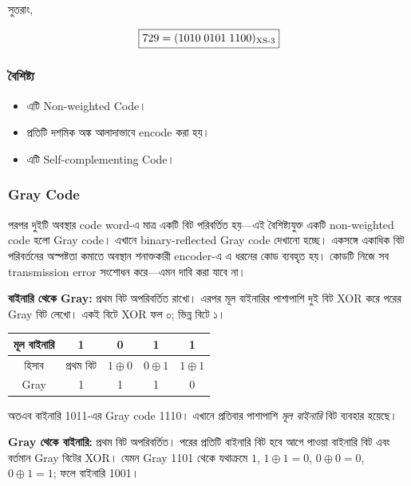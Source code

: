 সুতরাং,

\[
\boxed{
729
=
(1010\;0101\;1100)_{\text{\textenglish{XS-3}}}
}
\]

\subsubsection*{বৈশিষ্ট্য}

\begin{itemize}[label={{\bulletfont\textbullet}}, leftmargin=*, nosep]
    \item এটি \textenglish{Non-weighted Code}।
    \item প্রতিটি দশমিক অঙ্ক আলাদাভাবে
    \textenglish{encode} করা হয়।
    \item এটি \textenglish{Self-complementing Code}।
\end{itemize}


\subsubsection*{Gray Code}
পরপর দুইটি অবস্থার code word-এ মাত্র একটি বিট পরিবর্তিত হয়—এই বৈশিষ্ট্যযুক্ত একটি non-weighted code হলো Gray code। এখানে binary-reflected Gray code দেখানো হচ্ছে। একসঙ্গে একাধিক বিট পরিবর্তনের অস্পষ্টতা কমাতে অবস্থান শনাক্তকারী encoder-এ এ ধরনের কোড ব্যবহৃত হয়। কোডটি নিজে সব transmission error সংশোধন করে—এমন দাবি করা যাবে না।

\textbf{বাইনারি থেকে Gray:} প্রথম বিট অপরিবর্তিত রাখো। এরপর মূল বাইনারির পাশাপাশি দুই বিট XOR করে পরের Gray বিট লেখো। একই বিটে XOR ফল ০; ভিন্ন বিটে ১।
\begin{center}\begin{tabular}{|c|c|c|c|c|}\hline
মূল বাইনারি&1&0&1&1\\\hline
হিসাব&প্রথম বিট&$1\oplus0$&$0\oplus1$&$1\oplus1$\\\hline
Gray&1&1&1&0\\\hline
\end{tabular}\end{center}
অতএব বাইনারি 1011-এর Gray code 1110। এখানে প্রতিবার পাশাপাশি \emph{মূল বাইনারি} বিট ব্যবহার হয়েছে।

\textbf{Gray থেকে বাইনারি:} প্রথম বিট অপরিবর্তিত। পরের প্রতিটি বাইনারি বিট হবে আগে পাওয়া বাইনারি বিট এবং বর্তমান Gray বিটের XOR। যেমন Gray 1101 থেকে যথাক্রমে $1$, $1\oplus1=0$, $0\oplus0=0$, $0\oplus1=1$; ফলে বাইনারি 1001।

